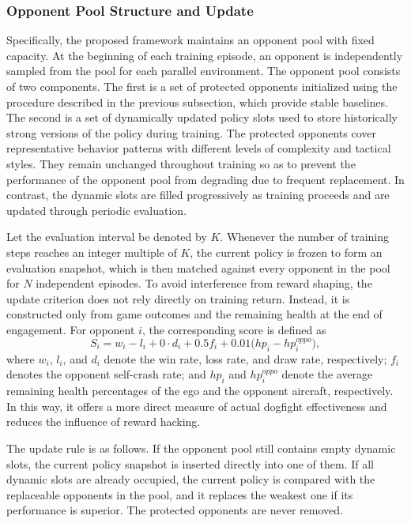 \documentclass[pdflatex,sn-mathphys-num]{sn-jnl}%
\theoremstyle{thmstyleone}%
\theoremstyle{thmstyletwo}%
\theoremstyle{thmstylethree}%
\begin{document}
\subsubsection{Opponent Pool Structure and Update}

Specifically, the proposed framework maintains an opponent pool with fixed capacity. At the beginning of each training episode, an opponent is independently sampled from the pool for each parallel environment. The opponent pool consists of two components. The first is a set of protected opponents initialized using the procedure described in the previous subsection, which provide stable baselines. The second is a set of dynamically updated policy slots used to store historically strong versions of the policy during training. The protected opponents cover representative behavior patterns with different levels of complexity and tactical styles. They remain unchanged throughout training so as to prevent the performance of the opponent pool from degrading due to frequent replacement. In contrast, the dynamic slots are filled progressively as training proceeds and are updated through periodic evaluation.

Let the evaluation interval be denoted by $K$. Whenever the number of training steps reaches an integer multiple of $K$, the current policy is frozen to form an evaluation snapshot, which is then matched against every opponent in the pool for $N$ independent episodes. To avoid interference from reward shaping, the update criterion does not rely directly on training return. Instead, it is constructed only from game outcomes and the remaining health at the end of engagement. For opponent $i$, the corresponding score is defined as
\begin{equation}
S_i = w_i - l_i + 0\cdot d_i + 0.5f_i + 0.01\bigl(hp_i - hp_i^{oppo}\bigr),
\end{equation}
where $w_i$, $l_i$, and $d_i$ denote the win rate, loss rate, and draw rate, respectively; $f_i$ denotes the opponent self-crash rate; and $hp_i$ and $hp_i^{oppo}$ denote the average remaining health percentages of the ego and the opponent aircraft, respectively. In this way, it offers a more direct measure of actual dogfight effectiveness and reduces the influence of reward hacking.

The update rule is as follows. If the opponent pool still contains empty dynamic slots, the current policy snapshot is inserted directly into one of them. If all dynamic slots are already occupied, the current policy is compared with the replaceable opponents in the pool, and it replaces the weakest one if its performance is superior. The protected opponents are never removed. 
\end{document}

